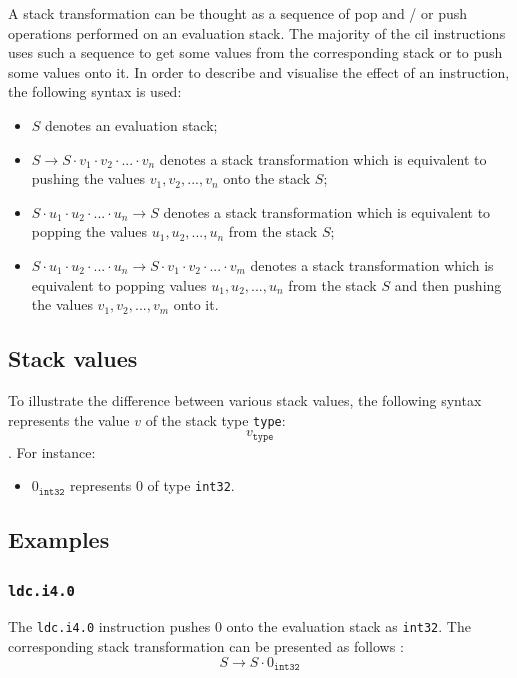 \documentclass{article}
\numberwithin{equation}{section}
\newcommand{\sval}[2] {
	#1_\texttt{#2}
}
\begin{document}
A stack transformation can be thought as a sequence of pop and / or push operations performed on an evaluation stack. The majority of the \acrshort{cil} instructions uses such a sequence to get some values from the corresponding stack or to push some values onto it. In order to describe and visualise the effect of an instruction, the following syntax is used:
\begin{itemize}
	\item{$S$ denotes an evaluation stack;}
	\item{$S \rightarrow S \cdot v_1 \cdot v_2 \cdot ... \cdot v_n$ denotes a stack transformation which is equivalent to pushing the values $v_1, v_2, ..., v_n$ onto the stack $S$;}
	\item{$S \cdot u_1 \cdot u_2 \cdot ... \cdot u_n \rightarrow S$ denotes a stack transformation which is equivalent to popping the values $u_1, u_2, ..., u_n$ from the stack $S$;}
	\item{$S \cdot u_1 \cdot u_2 \cdot ... \cdot u_n \rightarrow S \cdot v_1 \cdot v_2 \cdot ... \cdot v_m$ denotes a stack transformation which is equivalent to popping values $u_1, u_2, ..., u_n$ from the stack $S$ and then pushing the values $v_1, v_2, ..., v_m$ onto it.}
\end{itemize}

\subsection{Stack values}

To illustrate the difference between various stack values, the following syntax represents the value $v$ of the stack type \texttt{type}:
$$
	\sval{v}{type}
$$.
For instance:
\begin{itemize}
	\item{$\sval{0}{int32}$ represents $0$ of type \texttt{int32}}.
\end{itemize}

\subsection{Examples}
\label{sec:instruction_examples}

\subsubsection{\texttt{ldc.i4.0}}
\label{sec:desc_ldci40}

The \texttt{ldc.i4.0} instruction pushes $0$ onto the evaluation stack as \texttt{int32}. The corresponding stack transformation can be presented as follows \cite{ecmaStandard}:
$$
	S \rightarrow S \cdot 0_\texttt{int32}
$$
\end{document}
